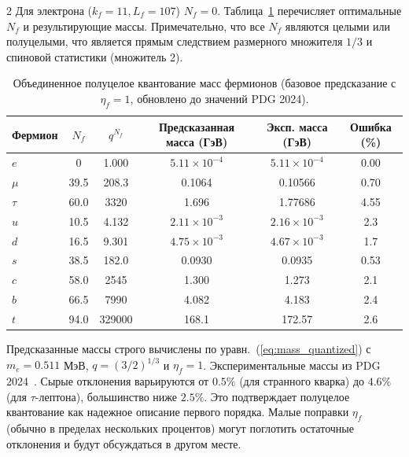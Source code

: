 \documentclass[11pt,a4paper]{article}
\begin{document}
\begin{multicols}{2}
		Для электрона (\(k_f=11, L_f=107\)) \(N_f=0\). Таблица~\ref{tab:fermions_new} перечисляет оптимальные \(N_f\) и результирующие массы. Примечательно, что все \(N_f\) являются целыми или полуцелыми, что является прямым следствием размерного множителя \(1/3\) и спиновой статистики (множитель 2).
		
		\begin{table}[H]
			\centering
			\caption{Объединенное полуцелое квантование масс фермионов (базовое предсказание с \(\eta_f=1\), обновлено до значений PDG 2024).}
			\label{tab:fermions_new}
			\tiny  
			\begin{tabular}{l c c c c c}
				\toprule
				Фермион & \(N_f\) & \(q^{N_f}\) & Предсказанная масса (ГэВ) & Эксп. масса (ГэВ) & Ошибка (\%) \\
				\midrule
				\(e\)   & 0      & 1.000 & \(5.11\times10^{-4}\) & \(5.11\times10^{-4}\) & 0.00 \\
				\(\mu\)  & 39.5   & 208.3 & 0.1064                & 0.10566              & 0.70 \\
				\(\tau\) & 60.0   & 3320  & 1.696                 & 1.77686              & 4.55 \\
				\(u\)   & 10.5   & 4.132 & \(2.11\times10^{-3}\)   & \(2.16\times10^{-3}\)  & 2.3 \\
				\(d\)   & 16.5   & 9.301 & \(4.75\times10^{-3}\)   & \(4.67\times10^{-3}\)  & 1.7 \\
				\(s\)   & 38.5   & 182.0 & 0.0930                & 0.0935               & 0.53 \\
				\(c\)   & 58.0   & 2545  & 1.300                 & 1.273                & 2.1 \\
				\(b\)   & 66.5   & 7990  & 4.082                 & 4.183                & 2.4 \\
				\(t\)   & 94.0   & 329000& 168.1                 & 172.57               & 2.6 \\
				\bottomrule
			\end{tabular}
			\par\smallskip
			\footnotesize 
			Предсказанные массы строго вычислены по уравн.~(\ref{eq:mass_quantized}) с \(m_e = 0.511\) МэВ, \(q = (3/2)^{1/3}\) и \(\eta_f = 1\). 
			Экспериментальные массы из PDG 2024~\cite{PDG2024}. 
			Сырые отклонения варьируются от \(0.5\%\) (для странного кварка) до \(4.6\%\) (для \(\tau\)-лептона), большинство ниже \(2.5\%\). 
			Это подтверждает полуцелое квантование как надежное описание первого порядка. 
			Малые поправки \(\eta_f\) (обычно в пределах нескольких процентов) могут поглотить остаточные отклонения и будут обсуждаться в другом месте.
		\end{table}
		

\end{multicols}
\end{document}
